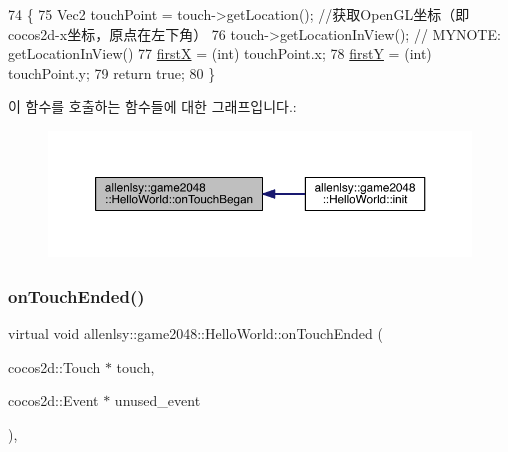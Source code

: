 \begin{DoxyCode}
74                                                                               \{
75         Vec2 touchPoint = touch->getLocation(); \textcolor{comment}{//获取OpenGL坐标（即cocos2d-x坐标，原点在左下角）}
76         touch->getLocationInView(); \textcolor{comment}{// MYNOTE: getLocationInView()}
77         \hyperlink{classallenlsy_1_1game2048_1_1_hello_world_acba62073618cde47da3b85a856832e69}{firstX} = (int) touchPoint.x;
78         \hyperlink{classallenlsy_1_1game2048_1_1_hello_world_a077f4900c33ee54cd90fa6112ce720bb}{firstY} = (\textcolor{keywordtype}{int}) touchPoint.y;
79         \textcolor{keywordflow}{return} \textcolor{keyword}{true};
80     \}
\end{DoxyCode}
이 함수를 호출하는 함수들에 대한 그래프입니다.\+:
\nopagebreak
\begin{figure}[H]
\begin{center}
\leavevmode
\includegraphics[width=350pt]{d5/d2b/classallenlsy_1_1game2048_1_1_hello_world_a0cc62fe1173f141d60833be4804f97d9_icgraph}
\end{center}
\end{figure}
\mbox{\label{classallenlsy_1_1game2048_1_1_hello_world_a99042e68bb9365cdb764cc9c3d9e6197}} 
\subsubsection{\texorpdfstring{on\+Touch\+Ended()}{onTouchEnded()}}
{\footnotesize\ttfamily virtual void allenlsy\+::game2048\+::\+Hello\+World\+::on\+Touch\+Ended (\begin{DoxyParamCaption}\item[{cocos2d\+::\+Touch $\ast$}]{touch,  }\item[{cocos2d\+::\+Event $\ast$}]{unused\+\_\+event }\end{DoxyParamCaption})\hspace{0.3cm}{\ttfamily [inline]}, {\ttfamily [virtual]}}



